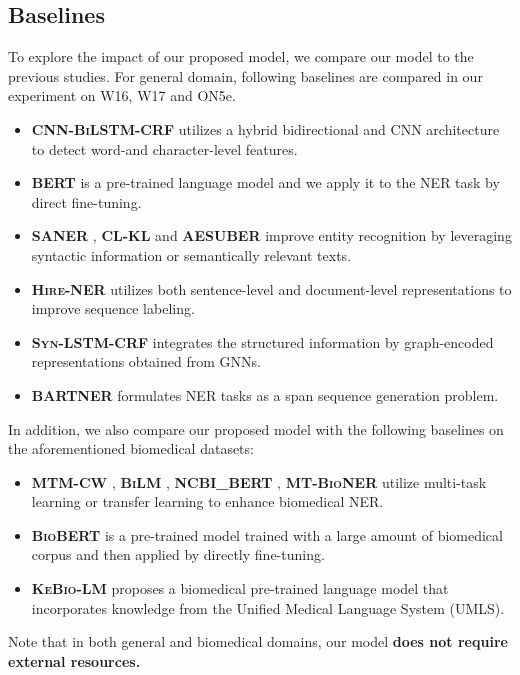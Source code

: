 \documentclass[11pt]{article}
\begin{document}
\subsection{Baselines}
To explore the impact of our proposed model, we compare our model to the previous studies.
For general domain, following baselines are compared in our experiment on W16, W17 and ON5e.
\begin{itemize}
    \item \textbf{\textsc{CNN-BiLSTM-CRF}} \cite{chiu2016named} utilizes a hybrid bidirectional and CNN architecture to detect word-and character-level features.
    \item \textbf{\textsc{BERT}} \cite{BERT} is a pre-trained language model and we apply it to the NER task by direct fine-tuning.
    \item \textbf{SANER} \cite{nie2020named}, \textbf{CL-KL} \cite{wang2021improving} and \textbf{\textsc{AESUBER}} \cite{AESUBER} improve entity recognition by leveraging syntactic information or semantically relevant texts.
    \item \textbf{\textsc{Hire-NER}} \cite{luo2020hierarchical} utilizes both sentence-level and document-level representations to improve sequence labeling.
    \item \textbf{\textsc{Syn-LSTM-CRF}} \cite{xu2021better} integrates the structured information by graph-encoded representations obtained from GNNs.
    \item \textbf{\textsc{BARTNER}} \cite{yan2021unified} formulates NER tasks as a span sequence generation problem.
\end{itemize}
 In addition, we also compare our proposed model with the following baselines on the aforementioned biomedical datasets:
\begin{itemize}
    \item \textbf{\textsc{MTM-CW}} \cite{wang2019cross}, \textbf{\textsc{BiLM}} \cite{sachan2018effective}, \textbf{\textsc{NCBI\_BERT}} \cite{peng2019transfer}, \textbf{\textsc{MT-BioNER}} \cite{2021A} utilize multi-task learning or transfer learning to enhance biomedical NER.
    \item \textbf{\textsc{BioBERT}} \cite{biobert} is a pre-trained model trained with a large amount of biomedical corpus and then applied by directly fine-tuning.
\item \textbf{\textsc{\textsc{KeBio-LM}}} \cite{yuan2021improving} proposes a  biomedical pre-trained language model that incorporates knowledge from the Unified Medical Language System (UMLS).
\end{itemize}
Note that in both general and biomedical domains, our model \textbf{does not require external resources.} 
\end{document}
